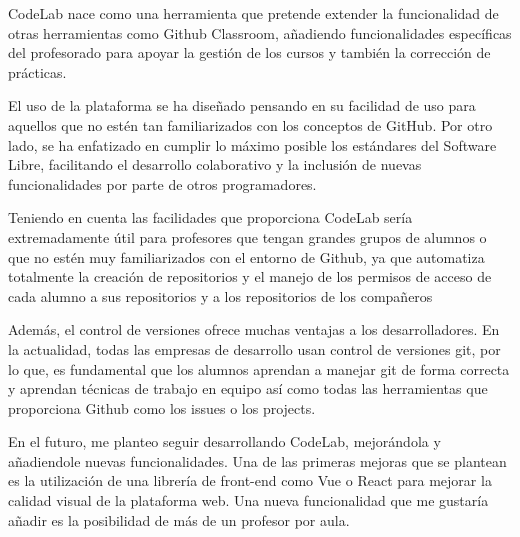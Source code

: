 

CodeLab nace como una herramienta que pretende extender la funcionalidad de otras herramientas como Github Classroom, añadiendo funcionalidades específicas del profesorado para apoyar la gestión de los cursos y también la corrección de prácticas. 

El uso de la plataforma se ha diseñado pensando en su facilidad de uso para aquellos que no estén tan familiarizados con los conceptos de GitHub. Por otro lado, se ha enfatizado en cumplir lo máximo posible los estándares del Software Libre, 
facilitando el desarrollo colaborativo y la inclusión de nuevas funcionalidades por parte de otros programadores.

Teniendo en cuenta las facilidades que proporciona CodeLab sería extremadamente útil para profesores que tengan grandes grupos de alumnos o que no estén muy familiarizados con el entorno de Github, ya que automatiza totalmente la creación de repositorios y el manejo de los permisos de acceso de cada alumno a sus repositorios y a los repositorios de los compañeros

Además, el control de versiones ofrece muchas ventajas a los desarrolladores. En la actualidad, todas las empresas de desarrollo usan control de versiones git, por lo que, es fundamental que los alumnos aprendan a manejar git de forma correcta y aprendan técnicas de trabajo en equipo así como todas las herramientas que proporciona Github como los issues o los projects.

En el futuro, me planteo seguir desarrollando CodeLab, mejorándola y añadiendole nuevas funcionalidades. Una de las primeras mejoras que se plantean es la utilización de una librería de front-end como Vue o React para mejorar la calidad visual de la plataforma web. Una nueva funcionalidad que me gustaría añadir es la posibilidad de más de un profesor por aula.